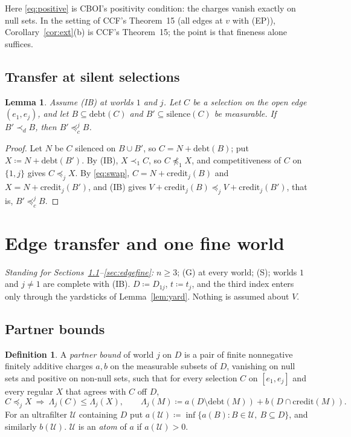 \documentclass[11pt]{article}
\newtheorem{lemma}[theorem]{Lemma}
\theoremstyle{definition}\newtheorem{definition}[theorem]{Definition}
\theoremstyle{remark}\newtheorem{remark}[theorem]{Remark}
\newcommand{\debt}{\mathrm{debt}}
\newcommand{\cred}{\mathrm{credit}}
\newcommand{\sil}{\mathrm{silence}}
\newcommand{\Uf}{\mathcal U}
\begin{document}
Here \eqref{eq:positive} is CBOI's positivity condition: the charges vanish
exactly on null sets. In the setting of CCF's Theorem~15 (all edges at $v$
with (EP)), Corollary~\ref{cor:ext}(b) is CCF's Theorem~15; the point is that
fineness alone suffices.

\subsection{Transfer at silent selections}

\begin{lemma}\label{lem:silent}
Assume (IB) at worlds $1$ and $j$. Let $C$ be a selection on the open edge
$(e_1,e_j)$, and let $B\subseteq\debt(C)$ and $B'\subseteq\sil(C)$ be
measurable. If $B'\prec_dB$, then $B'\preceq^j_cB$.
\end{lemma}
\begin{proof}
Let $N$ be $C$ silenced on $B\cup B'$, so $C=N+\debt(B)$; put
$X\coloneqq N+\debt(B')$. By (IB), $X\prec_1C$, so $C\not\preceq_1X$, and
competitiveness of $C$ on $\{1,j\}$ gives $C\preceq_jX$. By \eqref{eq:swap},
$C=N+\cred_j(B)$ and $X=N+\cred_j(B')$, and (IB) gives
$V+\cred_j(B)\preceq_jV+\cred_j(B')$, that is, $B'\preceq^j_cB$.
\end{proof}

\section{Edge transfer and one fine world}\label{sec:transfer}

\emph{Standing for Sections~\ref{sec:partner}--\ref{sec:edgefine}:} $n\ge3$;
(G) at every world; (S); worlds $1$ and $j\ne1$ are complete with (IB).
$D\coloneqq D_{1j}$, $t\coloneqq t_j$, and the third index enters only through
the yardsticks of Lemma~\ref{lem:yard}. Nothing is assumed about $V$.

\subsection{Partner bounds}\label{sec:partner}

\begin{definition}\label{def:partner}
A \emph{partner bound} of world $j$ on $D$ is a pair of finite nonnegative
finitely additive charges $a,b$ on the measurable subsets of $D$, vanishing on
null sets and positive on non-null sets, such that for every selection $C$ on
$[e_1,e_j]$ and every regular $X$ that agrees with $C$ off $D$,
\begin{equation}
 C\preceq_jX\ \Longrightarrow\ \Lambda_j(C)\le\Lambda_j(X),\qquad
 \Lambda_j(M)\coloneqq a(D\setminus\debt(M))+b(D\cap\cred(M)).
 \label{eq:partner}
\end{equation}
For an ultrafilter $\Uf$ containing $D$ put
$a(\Uf)\coloneqq\inf\{a(B):B\in\Uf,\ B\subseteq D\}$, and similarly
$b(\Uf)$. $\Uf$ is an \emph{atom} of $a$ if $a(\Uf)>0$.
\end{definition}
\end{document}
